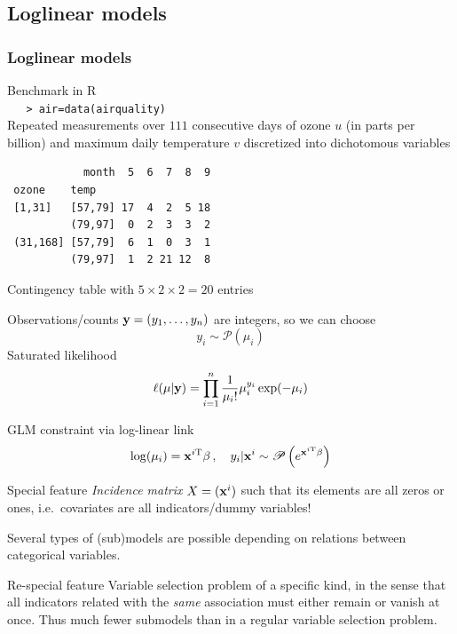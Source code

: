 \subsection{Loglinear models}
\begin{frame}[label=LLmdL,fragile]
\frametitle{Loglinear models}

\hyperlink{LLintro}{}
\begin{example}[{\sf airquality}]
Benchmark in {\sf R}\small\\
\verb&   > air=data(airquality)&\\
\normalsize
Repeated measurements over $111$ consecutive days of
ozone $u$ (in parts per billion) and maximum daily temperature $v$ 
discretized into dichotomous variables 
\footnotesize \begin{verbatim}
            month  5  6  7  8  9
 ozone    temp
 [1,31]   [57,79] 17  4  2  5 18
          (79,97]  0  2  3  3  2
 (31,168] [57,79]  6  1  0  3  1
          (79,97]  1  2 21 12  8
\end{verbatim}
\normalsize 
Contingency table with $5\times 2\times 2=20$ entries 
\end{example}

\end{frame}
\begin{slide}

Observations/counts $\mathbf{y}=(y_1,\ldots,y_n)$ are integers, so we can choose
$$
y_i\sim\mathscr{P}(\mu_i)
$$
Saturated likelihood
$$
\ell(\mu|\mathbf{y})=\prod_{i=1}^n\frac{1}{\mu_i!}\mu_i^{y_i}\exp(-\mu_i)
$$

\pause
GLM constraint via log-linear link
$$
\log(\mu_i)=\mathbf{x}^{i\mathrm{T}}\beta\,,\quad y_i|\mathbf{x}^i\sim\mathscr{P}\left(e^{\mathbf{x}^{i\mathrm{T}}\beta}\right)
$$

\end{slide}
\begin{slide}

\begin{block}{Special feature} {\em Incidence matrix} $X=(\mathbf{x}^i)$ 
such that its elements are all zeros or ones, i.e.~covariates 
are all indicators/dummy variables!
\end{block}

\vs\pause
Several types of (sub)models are possible depending on relations between categorical variables.

\vs\pause
\begin{block}{Re-special feature} 
Variable selection problem of a specific kind, in the sense that all indicators related
with the {\em same} association must either remain or vanish at once. Thus
much fewer submodels than
in a regular variable selection problem.
\end{block}

\end{slide}
